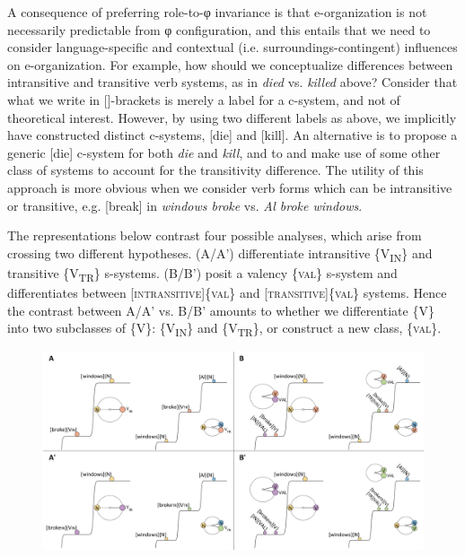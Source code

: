   A consequence of preferring role-to-φ invariance is that e-organization is not necessarily predictable from φ configuration, and this entails that we need to consider language-specific and contextual (i.e. surroundings-contingent) influences on e-organization. For example, how should we conceptualize differences between intransitive and transitive verb systems, as in \textit{died} vs. \textit{killed} above? Consider that what we write in []-brackets is merely a label for a c-system, and not of theoretical interest. However, by using two different labels as above, we implicitly have constructed distinct c-systems, [die] and [kill]. An alternative is to propose a generic [die] c-system for both \textit{die} and \textit{kill}, and to and make use of some other class of systems to account for the transitivity difference. The utility of this approach is more obvious when we consider verb forms which can be intransitive or transitive, e.g. [break] in \textit{windows broke} vs. \textit{Al broke windows}. 

  The representations below contrast four possible analyses, which arise from crossing two different hypotheses. (A/A') differentiate intransitive \{V\textsubscript{IN}\} and transitive \{V\textsubscript{TR}\} s-systems. (B/B') posit a valency \{\textsc{val}\} s-system and differentiates between [\textsc{intransitive}]\{\textsc{val}\} and [\textsc{transitive}]\{\textsc{val}\} systems. Hence the contrast between A/A' vs. B/B' amounts to whether we differentiate \{V\} into two subclasses of \{V\}: \{V\textsubscript{IN}\} and \{V\textsubscript{TR}\}, or construct a new class, \{\textsc{val}\}.

  
\begin{figure}
\includegraphics[width=\textwidth]{figures/Tilsen-img72.png}
\caption{\missingcaption}
\label{fig:4:22}
\end{figure}
 

